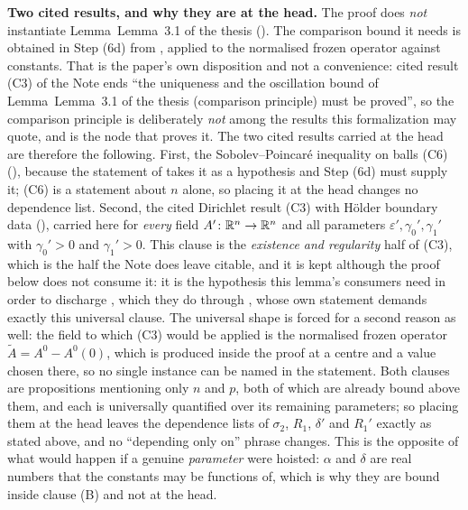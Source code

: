 \begin{lemma}
\medskip
\noindent\textbf{Two cited results, and why they are at the head.}  The proof
does \emph{not} instantiate Lemma~Lemma~3.1 of the thesis
().  The comparison bound it needs is
obtained in Step (6d) from , applied to the
normalised frozen operator against constants.  That is the paper's own
disposition and not a convenience: cited result (C3) of the Note ends ``the
uniqueness and the oscillation bound of Lemma~Lemma~3.1 of the thesis (comparison
principle) must be proved'', so the comparison principle is deliberately
\emph{not} among the results this formalization may quote, and
 is the node that proves it.  The two cited
results carried at the head are therefore the following.  First, the
Sobolev--Poincar\'e inequality on balls (C6)
(), because the statement of
 takes it as a hypothesis and Step (6d) must
supply it; (C6) is a statement about $n$ alone, so placing it at the head
changes no dependence list.  Second, the cited Dirichlet result (C3) with
H\"older boundary data (), carried here for
\emph{every} field $A'\colon\mathbb{R}^n\to\mathbb{R}^n$ and all parameters
$\varepsilon',\gamma_0',\gamma_1'$ with $\gamma_0'>0$ and $\gamma_1'>0$.  This
clause is the \emph{existence and regularity} half of (C3), which is the half
the Note does leave citable, and it is kept although the proof below does not
consume it: it is the hypothesis this lemma's consumers need in order to
discharge , which they do through
, whose own statement demands exactly this
universal clause.  The universal shape is forced for a second reason as well:
the field to which (C3) would be applied is the normalised frozen operator
$\widetilde A=A^0-A^0(0)$, which is produced inside the proof at a centre and a
value chosen there, so no single instance can be named in the statement.  Both
clauses are propositions
mentioning only $n$ and $p$, both of which are already bound above them, and
each is universally quantified over its remaining parameters; so placing them at
the head leaves the dependence lists of $\sigma_2$, $R_1$, $\delta'$ and $R_1'$
exactly as stated above, and no ``depending only on'' phrase changes.  This is
the opposite of what would happen if a genuine \emph{parameter} were hoisted:
$\alpha$ and $\delta$ are real numbers that the constants may be functions of,
which is why they are bound inside clause (B) and not at the head.
\end{lemma}
